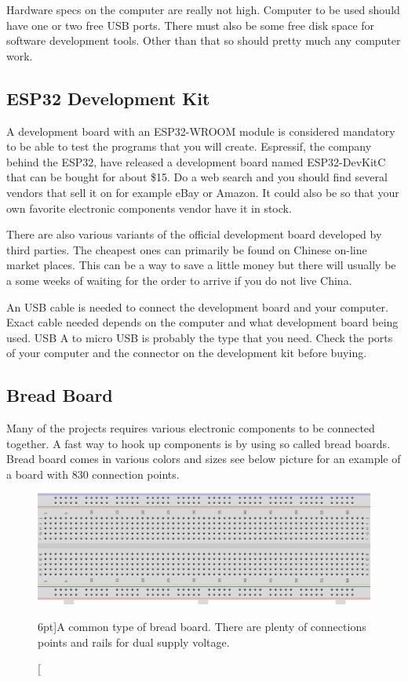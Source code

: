 \documentclass{tufte-book}
\begin{document}
Hardware specs on the computer are really not high. Computer to be used should 
have one or two free USB ports. There must also be some free disk space for 
software development tools. Other than that so should pretty much any computer 
work.

\subsection{ESP32 Development Kit}
A development board with an ESP32-WROOM module is considered mandatory to be 
able to test the programs that you will create. Espressif, the company behind 
the ESP32, have released a development board named ESP32-DevKitC that can be 
bought for about \$15. Do a web search and you should find several vendors that 
sell it on for example eBay or Amazon. It could also be so that your own 
favorite electronic components vendor have it in stock.

There are also various variants of the official development board developed by 
third parties. The cheapest ones can primarily be found on Chinese on-line 
market places. This can be a way to save a little money but there will usually 
be a some weeks of waiting for the order to arrive if you do not live China.

An USB cable is needed to connect the development board and your computer. 
Exact cable needed depends on the computer and what development board being 
used. USB A to micro USB is probably the type that you need. Check the ports of 
your computer and the connector on the development kit before buying.

\subsection{Bread Board}
Many of the projects requires various electronic components to be connected 
together. A fast way to hook up components is by using so called bread boards. 
Bread board comes in various colors and sizes see below picture for an example 
of a board with 830 connection points.

\begin{figure}
	\includegraphics{bread_board.png}
	\caption[Bread board $n$.][6pt]{A common type of bread board. There are plenty of connections points and rails for dual supply voltage.}
	\label{fig:bread_board}
\end{figure}
\end{document}
